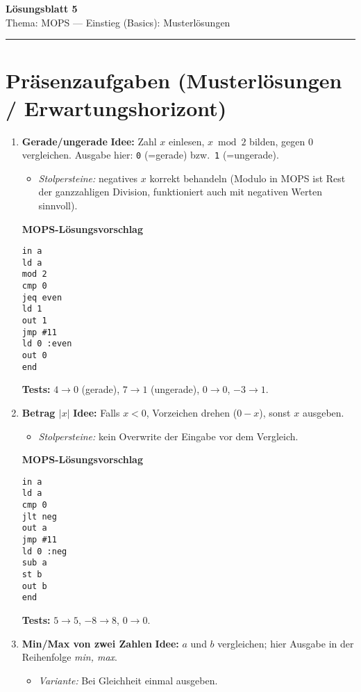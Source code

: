 \documentclass[11pt,a4paper]{scrartcl}
\newcommand{\blatttyp}{Lösungsblatt 5}
\newcommand{\thema}{MOPS — Einstieg (Basics): Musterlösungen}
\begin{document}
{\Large\textbf{\blatttyp}}\\[-0.25em]
{\normalsize Thema: \thema}
\par\hrule\vspace{0.8em}

\section*{Präsenzaufgaben (Musterlösungen / Erwartungshorizont)}

\begin{enumerate}[leftmargin=*,label=\textbf{Aufgabe~\arabic*:}, itemsep=1.0em]

\item \textbf{Gerade/ungerade}\quad
\textbf{Idee:} Zahl $x$ einlesen, $x \bmod 2$ bilden, gegen $0$ vergleichen. Ausgabe hier: \texttt{0} (=gerade) bzw.\ \texttt{1} (=ungerade).
\begin{itemize}
  \item \emph{Stolpersteine:} negatives $x$ korrekt behandeln (Modulo in MOPS ist Rest der ganzzahligen Division, funktioniert auch mit negativen Werten sinnvoll).
\end{itemize}

\textbf{MOPS-Lösungsvorschlag}
\begin{verbatim}
in a
ld a
mod 2
cmp 0
jeq even
ld 1
out 1
jmp #11
ld 0 :even
out 0
end
\end{verbatim}

\textbf{Tests:} $4 \to 0$ (gerade), $7 \to 1$ (ungerade), $0 \to 0$, $-3 \to 1$.

\item \textbf{Betrag $|x|$}\quad
\textbf{Idee:} Falls $x<0$, Vorzeichen drehen ($0-x$), sonst $x$ ausgeben.
\begin{itemize}
  \item \emph{Stolpersteine:} kein Overwrite der Eingabe vor dem Vergleich.
\end{itemize}

\textbf{MOPS-Lösungsvorschlag}
\begin{verbatim}
in a
ld a
cmp 0
jlt neg
out a
jmp #11
ld 0 :neg
sub a
st b
out b
end
\end{verbatim}

\textbf{Tests:} $5 \to 5$, $-8 \to 8$, $0 \to 0$.

\item \textbf{Min/Max von zwei Zahlen}\quad
\textbf{Idee:} $a$ und $b$ vergleichen; hier Ausgabe in der Reihenfolge \emph{min, max}.
\begin{itemize}
  \item \emph{Variante:} Bei Gleichheit einmal ausgeben.
\end{itemize}


\end{enumerate}
\end{document}
